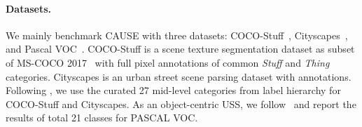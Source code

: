 \documentclass{article} \usepackage{iclr2024_conference,times}
\begin{document}
\paragraph{Datasets.}
We mainly benchmark CAUSE with three datasets: COCO-Stuff~\citep{caesar2018coco}, Cityscapes~\citep{cordts2016cityscapes}, and Pascal VOC~\citep{everingham2010pascal}. COCO-Stuff is a scene texture segmentation dataset as subset of MS-COCO 2017~\citep{lin2014microsoft} with full pixel annotations of common \textit{Stuff} and \textit{Thing} categories. Cityscapes is an urban street scene parsing dataset with annotations. Following \citet{ji2019invariant, cho2021picie}, we use the curated 27 mid-level categories from label hierarchy for COCO-Stuff and Cityscapes. As an object-centric USS, we follow~\citet{van2022discovering} and report the results of total 21 classes for PASCAL VOC.
\end{document}
